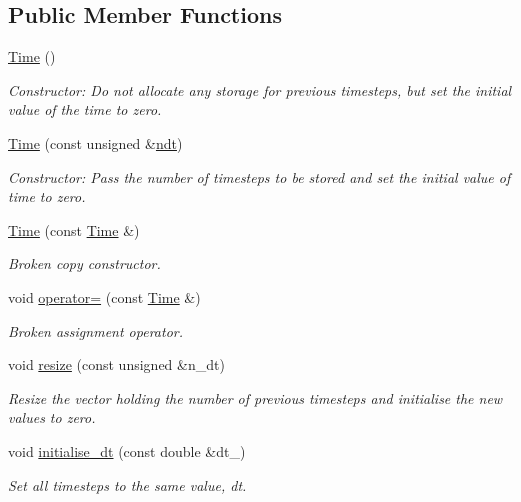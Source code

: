 \subsection*{Public Member Functions}
\begin{DoxyCompactItemize}
\item 
\hyperlink{classoomph_1_1Time_aed3c6b92973210d2347fc5be372e41a8}{Time} ()
\begin{DoxyCompactList}\small\item\em Constructor\+: Do not allocate any storage for previous timesteps, but set the initial value of the time to zero. \end{DoxyCompactList}\item 
\hyperlink{classoomph_1_1Time_af933eb465690f9630983aa0fe24782a3}{Time} (const unsigned \&\hyperlink{classoomph_1_1Time_ad40953c471eb3ce59921e6870ed755f3}{ndt})
\begin{DoxyCompactList}\small\item\em Constructor\+: Pass the number of timesteps to be stored and set the initial value of time to zero. \end{DoxyCompactList}\item 
\hyperlink{classoomph_1_1Time_a8fbf9712b8ac81929a4be2ed4c1bcdbd}{Time} (const \hyperlink{classoomph_1_1Time}{Time} \&)
\begin{DoxyCompactList}\small\item\em Broken copy constructor. \end{DoxyCompactList}\item 
void \hyperlink{classoomph_1_1Time_a97eff1a8bf218d7d54ea2728b6599a8b}{operator=} (const \hyperlink{classoomph_1_1Time}{Time} \&)
\begin{DoxyCompactList}\small\item\em Broken assignment operator. \end{DoxyCompactList}\item 
void \hyperlink{classoomph_1_1Time_aeab1acb1e182797c4194af84c0583c3f}{resize} (const unsigned \&n\+\_\+dt)
\begin{DoxyCompactList}\small\item\em Resize the vector holding the number of previous timesteps and initialise the new values to zero. \end{DoxyCompactList}\item 
void \hyperlink{classoomph_1_1Time_abc1e02cc2988b603bd5e1f6747381546}{initialise\+\_\+dt} (const double \&dt\+\_\+)
\begin{DoxyCompactList}\small\item\em Set all timesteps to the same value, dt. \end{DoxyCompactList}\item 

\end{DoxyCompactItemize}
